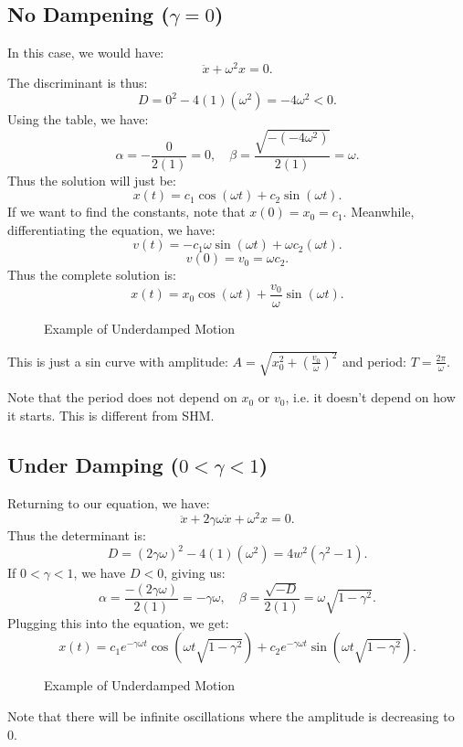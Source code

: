 \documentclass[../main/main.tex]{subfiles}
\begin{document}
\subsection{No Dampening ($\gamma=0$)} 
In this case, we would have: \[
	\ddot{x}+\omega^2x=0
.\] The discriminant is thus: \[
D=0^2-4(1)(\omega^2)=-4\omega^2<0
.\] Using the table, we have: \[
\alpha=-\frac{0}{2(1)}=0, \quad\beta = \frac{\sqrt{-(-4\omega^2)}}{2(1)} = \omega
.\] Thus the solution will just be: \[
x(t) = c_1\cos(\omega t)+c_2\sin(\omega t)
.\] If we want to find the constants, note that $x(0)=x_0=c_1$. Meanwhile, differentiating the equation, we have: \[
v(t) = -c_1\omega\sin(\omega t)+\omega c_2(\omega t) 
.\] \[
v(0)=v_0=\omega c_2
.\] Thus the complete solution is: \[
x(t) = x_0 \cos(\omega t) + \frac{v_0}{\omega}\sin(\omega t)
.\] 
\begin{figure}[h!]
	\centering
	\caption{ Example of Underdamped Motion}
	\label{fig:}
\end{figure}
This is just a sin curve with amplitude: $A=\sqrt{x_0^2+\left( \frac{v_0}{\omega} \right) ^2} $ and period: $T=\frac{2\pi}{\omega}$.
\begin{remark}
	Note that the period does not depend on $x_0$ or $v_0$, i.e. it doesn't depend on how it starts. This is different from SHM.
\end{remark}
\subsection{Under Damping ($0<\gamma<1$)}
Returning to our equation, we have: \[
	\ddot{x} + 2\gamma\omega \dot{x} + \omega^2x = 0
.\] Thus the determinant is: \[
D=(2\gamma\omega)^2-4(1)(\omega^2)=4w^2(\gamma^2-1)
.\] If $0<\gamma<1$, we have $D<0$, giving us:  \[
\alpha = \frac{-(2\gamma\omega)}{2(1)}=-\gamma\omega,\quad \beta=\frac{\sqrt{-D} }{2(1)}=\omega\sqrt{1-\gamma^2} 
.\] Plugging this into the equation, we get: \[
x(t) = c_1 e^{-\gamma\omega t}\cos(\omega t\sqrt{1-\gamma^2} ) +c_2 e^{-\gamma\omega t}\sin(\omega t\sqrt{1-\gamma^2} )
.\]
\begin{figure}[h!]
	\centering
	\caption{ Example of Underdamped Motion}
	\label{fig:}
\end{figure}
\begin{remark}
	Note that there will be infinite oscillations where the amplitude is decreasing to 0.
\end{remark}
\end{document}
